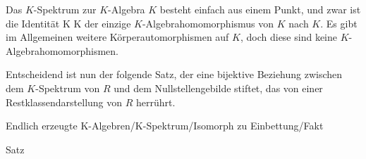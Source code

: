 
{


Das $K$-Spektrum zur $K$-Algebra $K$ besteht einfach aus einem Punkt, und zwar ist die Identität
\maabb {} { K } { K
} {}
der einzige $K$-Algebrahomo\-morphismus von $K$ nach $K$. Es gibt im Allgemeinen weitere Körperautomorphismen auf $K$, doch diese sind keine $K$-Algebrahomomorphismen.


}


Entscheidend ist nun der folgende Satz, der eine bijektive Beziehung zwischen dem $K$-Spektrum von $R$ und dem Nullstellengebilde stiftet, das von einer Restklassendarstellung von $R$ herrührt.



{Endlich erzeugte K-Algebren/K-Spektrum/Isomorph zu Einbettung/Fakt}

{Satz}

{}

{


\faktsituation {}



\faktzusatz {}

\faktzusatz {}


}

